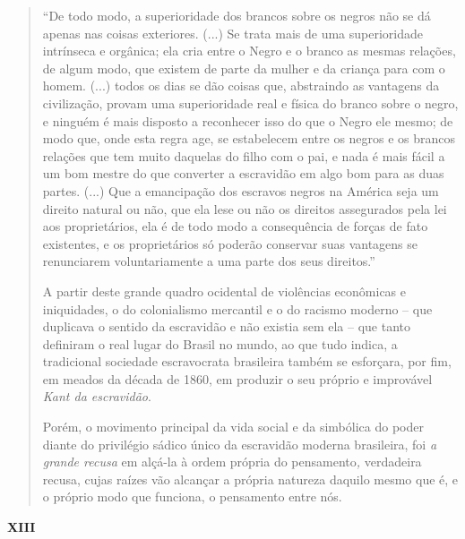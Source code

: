 \begin{quote}
``De todo modo, a superioridade dos brancos sobre os negros não se dá
apenas nas coisas exteriores. (...) Se trata mais de uma superioridade
intrínseca e orgânica; ela cria entre o Negro e o branco as mesmas
relações, de algum modo, que existem de parte da mulher e da criança
para com o homem. (...) todos os dias se dão coisas que, abstraindo as
vantagens da civilização, provam uma superioridade real e física do
branco sobre o negro, e ninguém é mais disposto a reconhecer isso do que
o Negro ele mesmo; de modo que, onde esta regra age, se estabelecem
entre os negros e os brancos relações que tem muito daquelas do filho
com o pai, e nada é mais fácil a um bom mestre do que converter a
escravidão em algo bom para as duas partes. (...) Que a emancipação dos
escravos negros na América seja um direito natural ou não, que ela lese
ou não os direitos assegurados pela lei aos proprietários, ela é de todo
modo a consequência de forças de fato existentes, e os proprietários só
poderão conservar suas vantagens se renunciarem voluntariamente a uma
parte dos seus direitos.''

A partir deste grande quadro ocidental de violências econômicas e
iniquidades, o do colonialismo mercantil e o do racismo moderno -- que
duplicava o sentido da escravidão e não existia sem ela -- que tanto
definiram o real lugar do Brasil no mundo, ao que tudo indica, a
tradicional sociedade escravocrata brasileira também se esforçara, por
fim, em meados da década de 1860, em produzir o seu próprio e improvável
\emph{Kant da escravidão}.

Porém, o movimento principal da vida social e da simbólica do poder
diante do privilégio sádico único da escravidão moderna brasileira, foi
\emph{a grande recusa} em alçá-la à ordem própria do pensamento\emph{,}
verdadeira recusa, cujas raízes vão alcançar a própria natureza daquilo
mesmo que é, e o próprio modo que funciona, o pensamento entre nós.
\end{quote}

\textbf{XIII}

